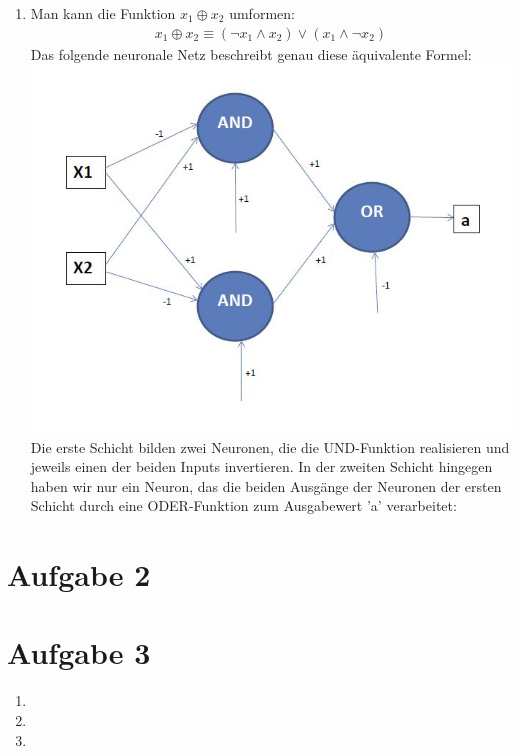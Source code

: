 \documentclass[a4paper,10pt]{article}
\begin{document}
\begin{enumerate}[~~a.)]
	 \item
    Man kann die Funktion $x_1 \oplus x_2$ umformen:
    \begin{align*}
        x_1 \oplus x_2 \equiv (\lnot x_1 \land x_2) \lor (x_1 \land \lnot x_2)
    \end{align*}
    Das folgende neuronale Netz beschreibt genau diese äquivalente Formel: \\
        \includegraphics[scale=0.65]{network.jpg} \\
    Die erste Schicht bilden zwei Neuronen, die die UND-Funktion realisieren und jeweils einen der beiden Inputs invertieren. In der zweiten Schicht hingegen haben wir nur ein Neuron, das die beiden Ausgänge der Neuronen der ersten Schicht durch eine ODER-Funktion zum Ausgabewert 'a' verarbeitet: 
	\end{enumerate}

\section*{Aufgabe 2}

\section*{Aufgabe 3}
    \begin{enumerate}[~~a.)]
	 \item
	 
	 \item
	
	 \item
	 
	\end{enumerate}
\end{document}
